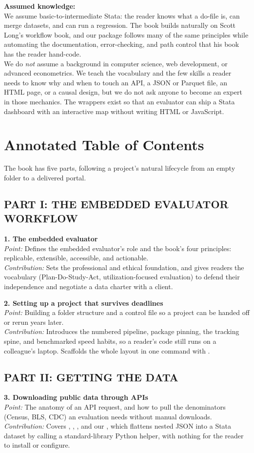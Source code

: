 \documentclass[11pt]{article}
\begin{document}
\textbf{Assumed knowledge:}\\
We assume basic-to-intermediate Stata: the reader knows what a do-file is, can merge datasets, and can run a regression. The book builds naturally on Scott Long's workflow book, and our  package follows many of the same principles while automating the documentation, error-checking, and path control that his book has the reader hand-code.\\
We do \textit{not} assume a background in computer science, web development, or advanced econometrics. We teach the vocabulary and the few skills a reader needs to know why and when to touch an API, a JSON or Parquet file, an HTML page, or a causal design, but we do not ask anyone to become an expert in those mechanics. The wrappers exist so that an evaluator can ship a Stata dashboard with an interactive map without writing HTML or JavaScript.

\section*{Annotated Table of Contents}
The book has five parts, following a project's natural lifecycle from an empty folder to a delivered portal.

\subsection*{PART I: THE EMBEDDED EVALUATOR WORKFLOW}
\textbf{1. The embedded evaluator}\\
\textit{Point:} Defines the embedded evaluator's role and the book's four principles: replicable, extensible, accessible, and actionable.\\
\textit{Contribution:} Sets the professional and ethical foundation, and gives readers the vocabulary (Plan-Do-Study-Act, utilization-focused evaluation) to defend their independence and negotiate a data charter with a client.

\textbf{2. Setting up a project that survives deadlines}\\
\textit{Point:} Building a folder structure and a control file so a project can be handed off or rerun years later.\\
\textit{Contribution:} Introduces the numbered pipeline, package pinning, the tracking spine, and benchmarked speed habits, so a reader's code still runs on a colleague's laptop. Scaffolds the whole layout in one command with .

\subsection*{PART II: GETTING THE DATA}
\textbf{3. Downloading public data through APIs}\\
\textit{Point:} The anatomy of an API request, and how to pull the denominators (Census, BLS, CDC) an evaluation needs without manual downloads.\\
\textit{Contribution:} Covers , , , and our , which flattens nested JSON into a Stata dataset by calling a standard-library Python helper, with nothing for the reader to install or configure.
\end{document}
